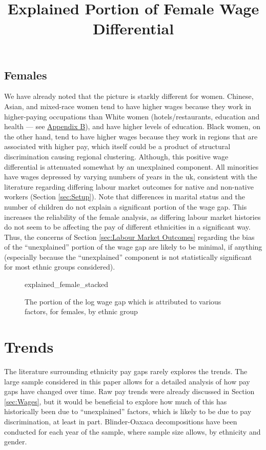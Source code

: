 \documentclass[class=article, crop=false]{standalone}
\begin{document}
\subsection{Females}
\label{sec:females_explained}
We have already noted that the picture is starkly different for women. Chinese, Asian, and mixed-race women tend to have higher wages because they work in higher-paying occupations than White women (hotels/restaurants, education and health --- see \hyperref[sec:appendixB]{Appendix B}), and have higher levels of education. Black women, on the other hand, tend to have higher wages because they work in regions that are associated with higher pay, which itself could be a product of structural discrimination causing regional clustering. Although, this positive wage differential is attenuated somewhat by an unexplained component. All minorities have wages depressed by varying numbers of years in the \acrshort{uk}, consistent with the literature regarding differing labour market outcomes for native and non-native workers (Section \ref{sec:Setup}). Note that differences in marital status and the number of children do not explain a significant portion of the wage gap. This increases the reliability of the female analysis, as differing labour market histories do not seem to be affecting the pay of different ethnicities in a significant way. Thus, the concerns of Section \ref{sec:Labour Market Outcomes} regarding the bias of the \enquote{unexplained} portion of the wage gap are likely to be minimal, if anything (especially because the \enquote{unexplained} component is not statistically significant for most ethnic groups considered).

\begin{figure}[]
\centering
    \title{Explained Portion of Female Wage Differential}
    {explained_female_stacked}
    \caption{The portion of the log wage gap which is attributed to various factors, for females, by ethnic group}
    \label{fig:explained_female_stacked}
\end{figure}

\section{Trends}
\label{sec:time_trends}
The literature surrounding ethnicity pay gaps rarely explores the trends. The large sample considered in this paper allows for a detailed analysis of how pay gaps have changed over time. Raw pay trends were already discussed in Section \ref{sec:Wages}, but it would be beneficial to explore how much of this has historically been due to \enquote{unexplained} factors, which is likely to be due to pay discrimination, at least in part. Blinder-Oaxaca decompositions have been conducted for each year of the sample, where sample size allows, by ethnicity and gender.
\end{document}
